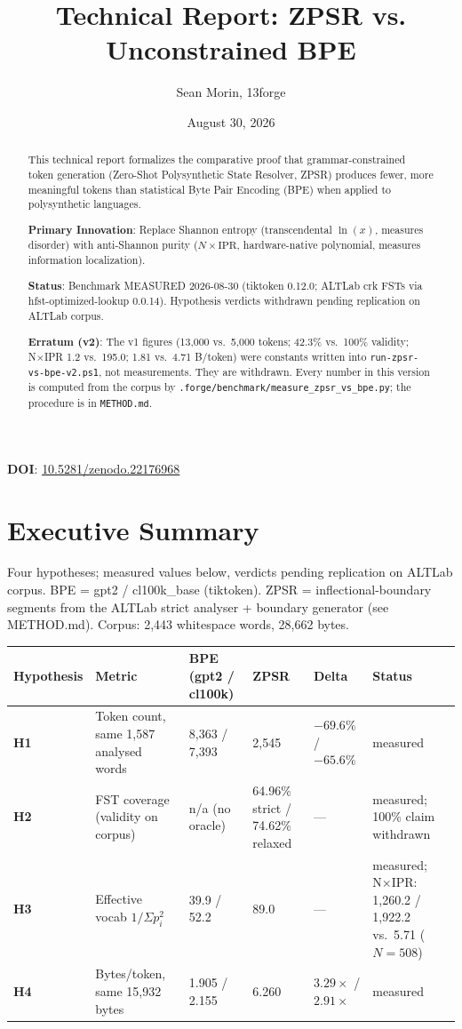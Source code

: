 \documentclass[11pt,oneside]{article}
\title{Technical Report: ZPSR vs. Unconstrained BPE}
\author{Sean Morin, 13forge}
\date{August 30, 2026}
\begin{document}
\maketitle

\begin{center}
\textbf{DOI}: \href{https://doi.org/10.5281/zenodo.22176968}{10.5281/zenodo.22176968}
\end{center}

\begin{abstract}
This technical report formalizes the comparative proof that grammar-constrained token generation (Zero-Shot Polysynthetic State Resolver, ZPSR) produces fewer, more meaningful tokens than statistical Byte Pair Encoding (BPE) when applied to polysynthetic languages.

\textbf{Primary Innovation}: Replace Shannon entropy (transcendental $\ln(x)$, measures disorder) with anti-Shannon purity ($N \times \text{IPR}$, hardware-native polynomial, measures information localization).

\textbf{Status}: Benchmark MEASURED 2026-08-30 (tiktoken 0.12.0; ALTLab crk FSTs via hfst-optimized-lookup 0.0.14). Hypothesis verdicts withdrawn pending replication on ALTLab corpus.

\textbf{Erratum (v2)}: The v1 figures (13,000 vs.\ 5,000 tokens; 42.3\% vs.\ 100\% validity; N×IPR 1.2 vs.\ 195.0; 1.81 vs.\ 4.71 B/token) were constants written into \texttt{run-zpsr-vs-bpe-v2.ps1}, not measurements. They are withdrawn. Every number in this version is computed from the corpus by \texttt{.forge/benchmark/measure\_zpsr\_vs\_bpe.py}; the procedure is in \texttt{METHOD.md}.
\end{abstract}

\section{Executive Summary}

Four hypotheses; measured values below, verdicts pending replication on ALTLab corpus. BPE = gpt2 / cl100k\_base (tiktoken). ZPSR = inflectional-boundary segments from the ALTLab strict analyser + boundary generator (see METHOD.md). Corpus: 2,443 whitespace words, 28,662 bytes.

\begin{center}
\begin{tabular}{llllll}
\toprule
Hypothesis & Metric & BPE (gpt2 / cl100k) & ZPSR & Delta & Status \\
\midrule
\textbf{H1} & Token count, same 1,587 analysed words & 8,363 / 7,393 & 2,545 & $-69.6\%$ / $-65.6\%$ & measured \\
\textbf{H2} & FST coverage (validity on corpus) & n/a (no oracle) & 64.96\% strict / 74.62\% relaxed & --- & measured; 100\% claim withdrawn \\
\textbf{H3} & Effective vocab $1/\Sigma p_i^2$ & 39.9 / 52.2 & 89.0 & --- & measured; N×IPR: 1,260.2 / 1,922.2 vs.\ 5.71 ($N{=}508$) \\
\textbf{H4} & Bytes/token, same 15,932 bytes & 1.905 / 2.155 & 6.260 & $3.29\times$ / $2.91\times$ & measured \\
\bottomrule
\end{tabular}
\end{center}
\end{document}
